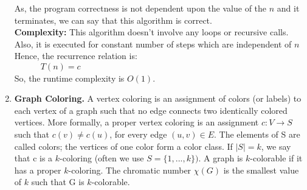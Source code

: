 \documentclass[12pt]{article}
\begin{document}
\begin{enumerate}
As, the program correctness is not dependent upon the value of the $n$ and it terminates, we can say that this algorithm is correct.\\
\textbf{Complexity:} This algorithm doesn't involve any loops or recursive calls. Also, it is executed for constant number of steps which are independent of $n$\\
Hence, the recurrence relation is:\\
\verb|		|$T(n) = c$\\
So, the runtime complexity is $O(1)$.\\
\pagebreak
\item \textbf{Graph Coloring.} A vertex coloring is an assignment of colors (or labels) to each vertex of a graph such that no edge connects two identically colored vertices. More formally, a proper vertex coloring is an assignment $c : V → S$ such that $c(v) \ne c(u)$, for every edge $(u, v) \in E$. The elements of S are called colors; the vertices of one color form a color class. If $|S| = k$, we say that c is a $k$-coloring (often we use $S = \{1, ..., k\})$. A graph is $k$-colorable if it has a proper $k$-coloring. The chromatic number $\chi(G)$ is the smallest value of $k$ such that G is $k$-colorable.


\end{enumerate}
\end{document}

